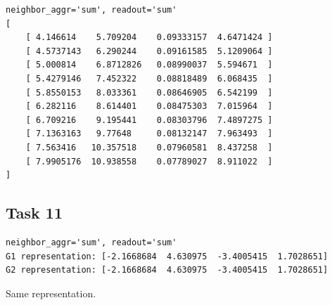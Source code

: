 \documentclass[a4paper]{article}
\begin{document}
\begin{verbatim}
neighbor_aggr='sum', readout='sum'
[
    [ 4.146614    5.709204    0.09333157  4.6471424 ]
    [ 4.5737143   6.290244    0.09161585  5.1209064 ]
    [ 5.000814    6.8712826   0.08990037  5.594671  ]
    [ 5.4279146   7.452322    0.08818489  6.068435  ]
    [ 5.8550153   8.033361    0.08646905  6.542199  ]
    [ 6.282116    8.614401    0.08475303  7.015964  ]
    [ 6.709216    9.195441    0.08303796  7.4897275 ]
    [ 7.1363163   9.77648     0.08132147  7.963493  ]
    [ 7.563416   10.357518    0.07960581  8.437258  ]
    [ 7.9905176  10.938558    0.07789027  8.911022  ]
]      
\end{verbatim}

\subsection*{Task 11}
\begin{verbatim}
neighbor_aggr='sum', readout='sum'
G1 representation: [-2.1668684  4.630975  -3.4005415  1.7028651]
G2 representation: [-2.1668684  4.630975  -3.4005415  1.7028651]
\end{verbatim}
Same representation.
% 
% 
\end{document}

